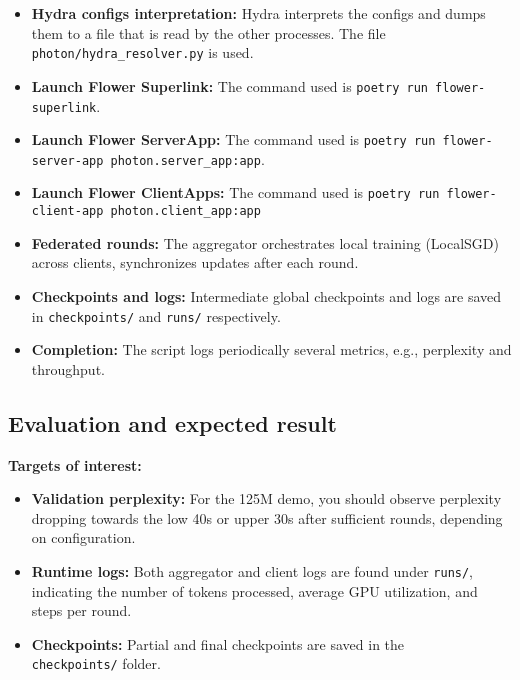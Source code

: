 \documentclass{sigplanconf}
\begin{document}
\begin{itemize}
  \item \textbf{Hydra configs interpretation:} Hydra interprets the configs and dumps them to a file that is read by the other processes. The file \texttt{photon/hydra\_resolver.py} is used.
  \item \textbf{Launch Flower Superlink:} The command used is \texttt{poetry run flower-superlink}.
  \item \textbf{Launch Flower ServerApp:} The command used is \texttt{poetry run flower-server-app photon.server\_app:app}.
  \item \textbf{Launch Flower ClientApps:} The command used is \texttt{poetry run flower-client-app photon.client\_app:app}
  \item \textbf{Federated rounds:} The aggregator orchestrates local training (LocalSGD) across clients, synchronizes updates after each round.
  \item \textbf{Checkpoints and logs:} Intermediate global checkpoints and logs are saved in \texttt{checkpoints/} and \texttt{runs/} respectively.
  \item \textbf{Completion:} The script logs periodically several metrics, e.g., perplexity and throughput.
\end{itemize}

\subsection{Evaluation and expected result}
\textbf{Targets of interest:}
\begin{itemize}
  \item \textbf{Validation perplexity:} For the 125M demo, you should observe perplexity dropping towards the low 40s or upper 30s after sufficient rounds, depending on configuration.
  \item \textbf{Runtime logs:} Both aggregator and client logs are found under \texttt{runs/}, indicating the number of tokens processed, average GPU utilization, and steps per round.
  \item \textbf{Checkpoints:} Partial and final checkpoints are saved in the\\ \texttt{checkpoints/} folder.
\end{itemize}
\end{document}
